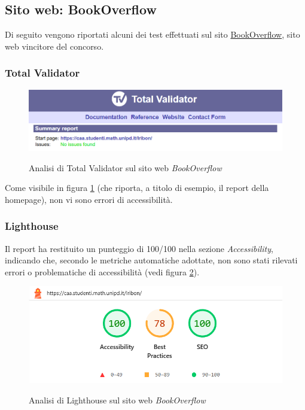 \subsection{Sito web: BookOverflow}
\noindent Di seguito vengono riportati alcuni dei test effettuati sul sito \href{https://caa.studenti.math.unipd.it/lribon/}{BookOverflow}, sito web vincitore del concorso.\\
\subsubsection{Total Validator}
\begin{figure}[H]
    \centering
    \includegraphics[width=0.8\linewidth, alt={Screenshot dell'analisi di Total Validator sul sito web BookOverflow}]{img/TV_bookoverflow.png}
    \caption{Analisi di Total Validator sul sito web \textit{BookOverflow}}\label{fig:TV_bookoverflow}
\end{figure}

\noindent Come visibile in figura \ref{fig:TV_bookoverflow} (che riporta, a titolo di esempio, il report della homepage), non vi sono errori di accessibilità.\\

\subsubsection{Lighthouse}
\noindent Il report ha restituito un punteggio di 100/100 nella sezione \textit{Accessibility}, indicando che, secondo le metriche automatiche adottate, non sono stati rilevati errori o problematiche di accessibilità (vedi figura \ref{fig:Lighthouse_bookoverflow}).
\begin{figure}[H]
    \centering
    \includegraphics[width=0.6\linewidth, alt={Screenshot dell'analisi di Lighthouse sul sito web BookOverflow}]{img/Lighthouse_bookoverflow.png}
    \caption{Analisi di Lighthouse sul sito web \textit{BookOverflow}}\label{fig:Lighthouse_bookoverflow}
\end{figure}

